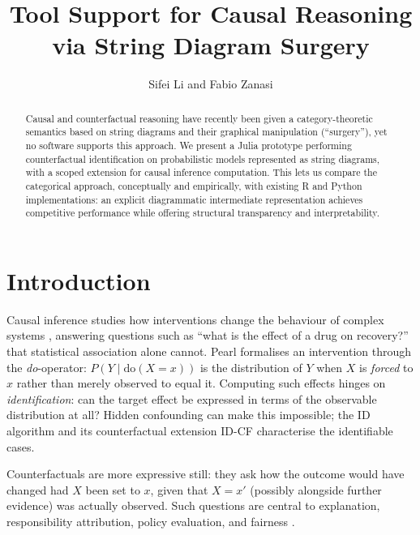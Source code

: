 \documentclass[runningheads]{llncs}
\title{Tool Support for Causal Reasoning \\ via String Diagram Surgery}
\author{Sifei Li and Fabio Zanasi}
\institute{University College London, United Kingdom}
\begin{document}
\maketitle

\begin{abstract}
Causal and counterfactual reasoning have recently been given a category-theoretic semantics based on string diagrams and their graphical manipulation (``surgery''), yet no software supports this approach. We present a Julia prototype performing counterfactual identification on probabilistic models represented as string diagrams, with a scoped extension for causal inference computation. This lets us compare the categorical approach, conceptually and empirically, with existing R and Python implementations: an explicit diagrammatic intermediate representation achieves competitive performance while offering structural transparency and interpretability.
\end{abstract}



\section{Introduction}
Causal inference studies how interventions change the behaviour of complex systems \cite{pearl2009causality}, answering questions such as ``what is the effect of a drug on recovery?'' that statistical association alone cannot. Pearl formalises an intervention through the \emph{do}-operator: $P(Y \mid \mathrm{do}(X{=}x))$ is the distribution of $Y$ when $X$ is \emph{forced} to $x$ rather than merely observed to equal it. Computing such effects hinges on \emph{identification}: can the target effect be expressed in terms of the observable distribution at all? Hidden confounding can make this impossible; the ID algorithm and its counterfactual extension ID-CF \cite{shpitser2008complete} characterise the identifiable cases.

Counterfactuals are more expressive still: they ask how the outcome would have changed had $X$ been set to $x$, given that $X=x'$ (possibly alongside further evidence) was actually observed. Such questions are central to explanation, responsibility attribution, policy evaluation, and fairness \cite{pearl2009causality}.
\end{document}
